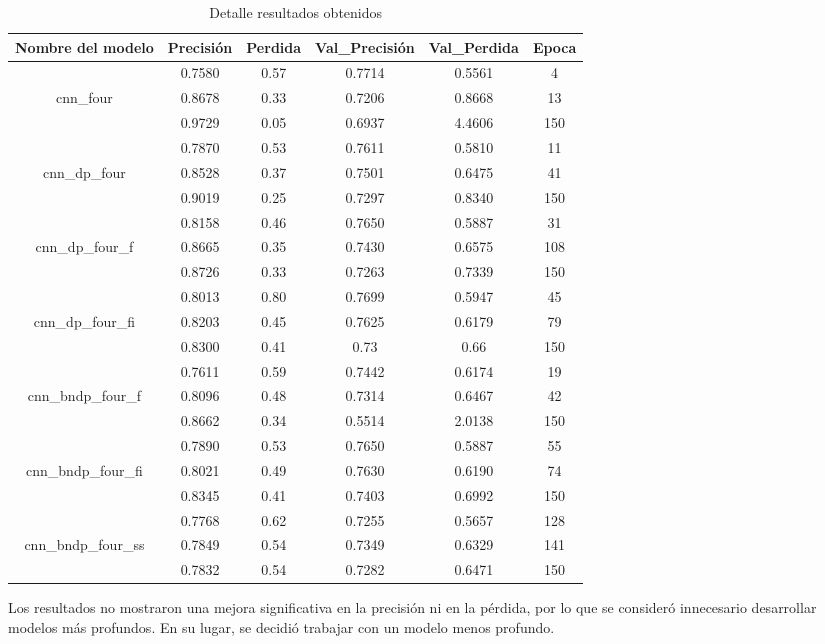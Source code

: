 \begin{table}[!ht]
	\centering
	\begin{tabular}{|c|c|c|c|c|c|}
		\hline
		\textbf{Nombre del modelo} & \textbf{Precisión} & \textbf{Perdida} & \textbf{Val\_Precisión} & \textbf{Val\_Perdida} & \textbf{Epoca} \\ \hline
		~ & 0.7580 & 0.57 & 0.7714 & 0.5561 & 4 \\ \cline{2-6}
		cnn\_four & 0.8678 & 0.33 & 0.7206 & 0.8668 & 13 \\ \cline{2-6}
		~ & 0.9729 & 0.05 & 0.6937 & 4.4606 & 150 \\ \hline
		~ & 0.7870 & 0.53 & 0.7611 & 0.5810 & 11 \\ \cline{2-6}
		cnn\_dp\_four & 0.8528 & 0.37 & 0.7501 & 0.6475 & 41 \\ \cline{2-6}
		~ & 0.9019 & 0.25 & 0.7297 & 0.8340 & 150 \\ \hline
		~ & 0.8158 & 0.46 & 0.7650 & 0.5887 & 31 \\ \cline{2-6}
		cnn\_dp\_four\_f & 0.8665 & 0.35 & 0.7430 & 0.6575 & 108 \\ \cline{2-6}
		~ & 0.8726 & 0.33 & 0.7263 & 0.7339 & 150 \\ \hline
		~ & 0.8013 & 0.80 & 0.7699 & 0.5947 & 45 \\ \cline{2-6}
		cnn\_dp\_four\_fi & 0.8203 & 0.45 & 0.7625 & 0.6179 & 79 \\ \cline{2-6}
		~ & 0.8300 & 0.41 & 0.73 & 0.66 & 150 \\ \hline
		~ & 0.7611 & 0.59 & 0.7442 & 0.6174 & 19 \\ \cline{2-6}
		cnn\_bndp\_four\_f & 0.8096 & 0.48 & 0.7314 & 0.6467 & 42 \\ \cline{2-6}
		~ & 0.8662 & 0.34 & 0.5514 & 2.0138 & 150 \\ \hline
		~ & 0.7890 & 0.53 & 0.7650 & 0.5887 & 55 \\ \cline{2-6}
		cnn\_bndp\_four\_fi & 0.8021 & 0.49 & 0.7630 & 0.6190 & 74 \\ \cline{2-6}
		~ & 0.8345 & 0.41 & 0.7403 & 0.6992 & 150 \\ \hline
		~ & 0.7768 & 0.62 & 0.7255 & 0.5657 & 128 \\ \cline{2-6}
		cnn\_bndp\_four\_ss & 0.7849 & 0.54 & 0.7349 & 0.6329 & 141 \\ \cline{2-6}
		~ & 0.7832 & 0.54 & 0.7282 & 0.6471 & 150 \\ \hline
	\end{tabular}
	\caption{Detalle resultados obtenidos}
	\label{tbl:10}
\end{table}

Los resultados no mostraron una mejora significativa en la precisión ni en la pérdida, por lo que se consideró innecesario desarrollar modelos más profundos. En su lugar, se decidió trabajar con un modelo menos profundo.
